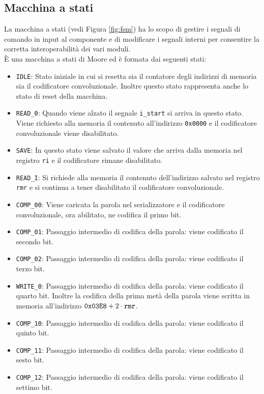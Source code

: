 \documentclass[fleqn,11pt]{article}
\begin{document}
\subsection{Macchina a stati}
La macchina a stati (vedi Figura \ref{fig:fsm}) ha lo scopo di gestire i segnali di comando in input al componente e di modificare i segnali interni per consentire la corretta interoperabilità dei vari moduli.\\
È una macchina a stati di Moore ed è formata dai seguenti stati:
\begin{itemize}
    \item \verb|IDLE|: Stato iniziale in cui si resetta sia il contatore degli indirizzi di memoria sia il codificatore convoluzionale. Inoltre questo stato rappresenta anche lo stato di reset della macchina.
    \item \verb|READ_0|: Quando viene alzato il segnale \verb|i_start| si arriva in questo stato. Viene richiesto alla memoria il contenuto all'indirizzo \verb|0x0000| e il codificatore convoluzionale viene disabilitato.
    \item \verb|SAVE|: In questo stato viene salvato il valore che arriva dalla memoria nel registro \verb|ri| e il codificatore rimane disabilitato.
    \item \verb|READ_I|: Si richiede alla memoria il contenuto dell'indirizzo salvato nel registro \verb|rmr| e si continua a tener disabilitato il codificatore convoluzionale.
    \item \verb|COMP_00|: Viene caricata la parola nel serializzatore e il codificatore convoluzionale, ora abilitato, ne codifica il primo bit.
    \item \verb|COMP_01|: Passaggio intermedio di codifica della parola: viene codificato il secondo bit.
    \item \verb|COMP_02|: Passaggio intermedio di codifica della parola: viene codificato il terzo bit.
    \item \verb|WRITE_0|: Passaggio intermedio di codifica della parola: viene codificato il quarto bit. Inoltre la codifica della prima metà della parola viene scritta in memoria all'indirizzo \(\verb|0x03E8| + 2\cdot\verb|rmr|\).
    \item \verb|COMP_10|: Passaggio intermedio di codifica della parola: viene codificato il quinto bit.
    \item \verb|COMP_11|: Passaggio intermedio di codifica della parola: viene codificato il sesto bit.
    \item \verb|COMP_12|: Passaggio intermedio di codifica della parola: viene codificato il settimo bit.

\end{itemize}
\end{document}
